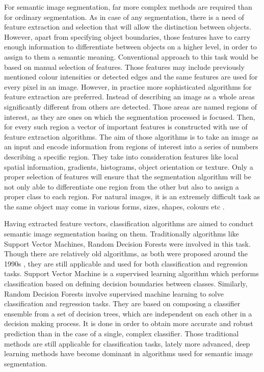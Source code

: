 For semantic image segmentation, far more complex methods are required than for ordinary segmentation. As in case of any segmentation, there is a need of feature extraction and selection that will allow the distinction between objects. However, apart from specifying object boundaries, those features have to carry enough information to differentiate between objects on a higher level, in order to assign to them a semantic meaning. Conventional approach to this task would be based on manual selection of features. Those features may include previously mentioned colour intensities or detected edges and the same features are used for every pixel in an image. However, in practice more sophisticated algorithms for feature extraction are preferred. Instead of describing an image as a whole areas significantly different from others are detected. Those areas are named regions of interest, as they are ones on which the segmentation processed is focused. Then, for every such region a vector of important features is constructed with use of feature extraction algorithms. The aim of those algorithms is to take an image as an input and encode information from regions of interest into a series of numbers describing a specific region. They take into consideration features like local spatial information, gradients, histograms, object orientation or texture. Only a proper selection of features will ensure that the segmentation algorithm will be not only able to differentiate one region from the other but also to assign a proper class to each region. For natural images, it is an extremely difficult task as the same object may come in various forms, sizes, shapes, colours etc \cite{segmentation_methods_descriptors_2}. 

Having extracted feature vectors, classification algorithms are aimed to conduct semantic image segmentation basing on them. Traditionally algorithms like Support Vector Machines, Random Decision Forests were involved in this task. Though there are relatively old algorithms, as both were proposed around the 1990s \cite{decision_forests,Cortes1995},  they are still applicable and used for both classification and regression tasks. Support Vector Machine is a supervised learning algorithm which performs classification based on defining decision boundaries between classes. Similarly, Random Decision Forests involve supervised machine learning to solve classification and regression tasks. They are based on composing a classifier ensemble from a set of decision trees, which are independent on each other in a decision making process. It is done in order to obtain more accurate and robust prediction than in the case of a single, complex classifier. Those traditional methods are still applicable for classification tasks, lately more advanced, deep learning methods have become dominant in algorithms used for semantic image segmentation. 

